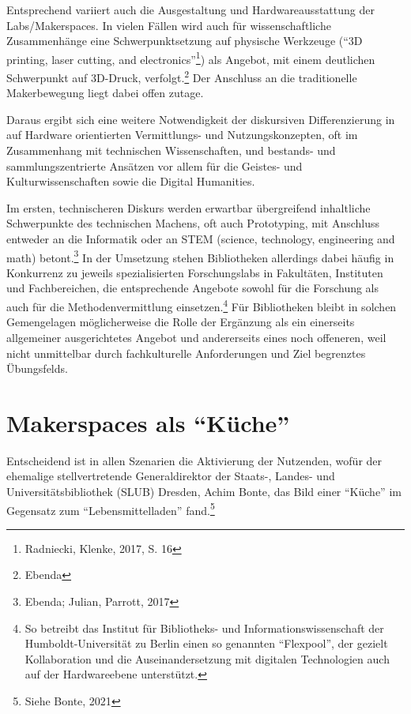 \documentclass[a4paper,
fontsize=11pt,
oneside,
numbers=noperiodatend,
parskip=half-,
bibliography=totoc,
final
]{scrartcl}
\begin{document}
Entsprechend variiert auch die Ausgestaltung und Hardwareausstattung der
Labs/Makerspaces. In vielen Fällen wird auch für wissenschaftliche
Zusammenhänge eine Schwerpunktsetzung auf physische Werkzeuge
(\enquote{3D printing, laser cutting, and electronics}\footnote{Radniecki,
  Klenke, 2017, S. 16}) als Angebot, mit einem deutlichen Schwerpunkt
auf 3D-Druck, verfolgt.\footnote{Ebenda} Der Anschluss an die
traditionelle Makerbewegung liegt dabei offen zutage.

Daraus ergibt sich eine weitere Notwendigkeit der diskursiven
Differenzierung in auf Hardware orientierten Vermittlungs- und
Nutzungskonzepten, oft im Zusammenhang mit technischen Wissenschaften,
und bestands- und sammlungszentrierte Ansätzen vor allem für die
Geistes- und Kulturwissenschaften sowie die Digital Humanities.

Im ersten, technischeren Diskurs werden erwartbar übergreifend
inhaltliche Schwerpunkte des technischen Machens, oft auch Prototyping,
mit Anschluss entweder an die Informatik oder an STEM (science,
technology, engineering and math) betont.\footnote{Ebenda; Julian,
  Parrott, 2017} In der Umsetzung stehen Bibliotheken allerdings dabei
häufig in Konkurrenz zu jeweils spezialisierten Forschungslabs in
Fakultäten, Instituten und Fachbereichen, die entsprechende Angebote
sowohl für die Forschung als auch für die Methodenvermittlung
einsetzen.\footnote{So betreibt das Institut für Bibliotheks- und
  Informationswissenschaft der Humboldt-Universität zu Berlin einen so
  genannten \enquote{Flexpool}, der gezielt Kollaboration und die
  Auseinandersetzung mit digitalen Technologien auch auf der
  Hardwareebene unterstützt.} Für Bibliotheken bleibt in solchen
Gemengelagen möglicherweise die Rolle der Ergänzung als ein einerseits
allgemeiner ausgerichtetes Angebot und andererseits eines noch
offeneren, weil nicht unmittelbar durch fachkulturelle Anforderungen und
Ziel begrenztes Übungsfelds.

\hypertarget{makerspaces-als-kuxfcche}{%
\section{\texorpdfstring{Makerspaces als
\enquote{Küche}}{Makerspaces als ``Küche''}}\label{makerspaces-als-kuxfcche}}

Entscheidend ist in allen Szenarien die Aktivierung der Nutzenden, wofür
der ehemalige stellvertretende Generaldirektor der Staats-, Landes- und
Universitätsbibliothek (SLUB) Dresden, Achim Bonte, das Bild einer
\enquote{Küche} im Gegensatz zum \enquote{Lebensmittelladen}
fand.\footnote{Siehe Bonte, 2021}
\end{document}
